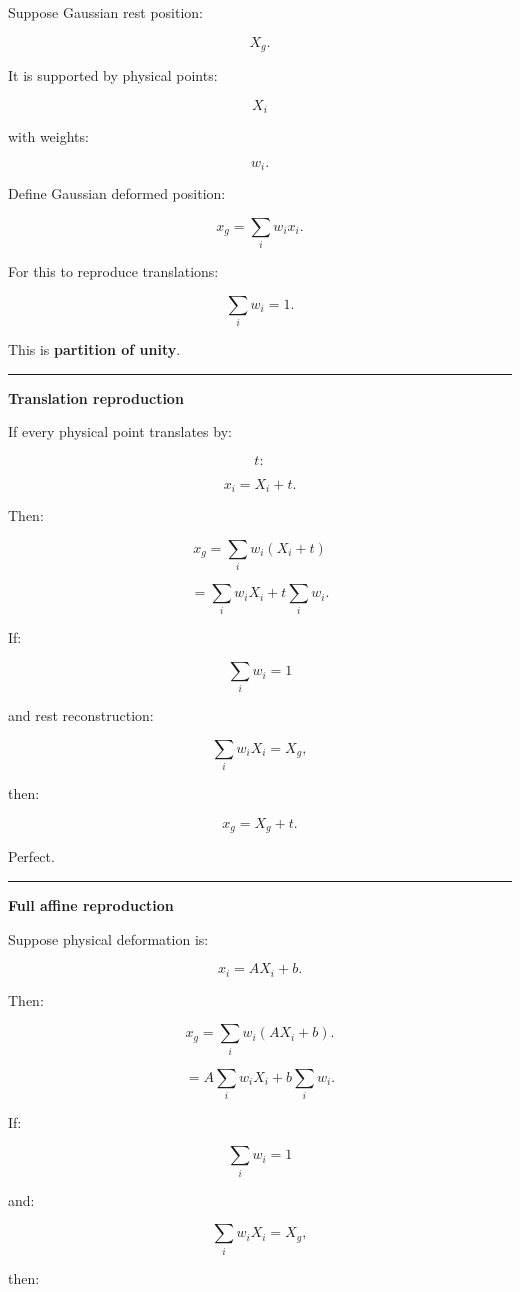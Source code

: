 Suppose Gaussian rest position:

\[
X_g.
\]

It is supported by physical points:

\[
X_i
\]

with weights:

\[
w_i.
\]

Define Gaussian deformed position:

\[
\boxed{
x_g
=
\sum_i
w_i x_i.
}
\]

For this to reproduce translations:

\[
\boxed{
\sum_i w_i=1.
}
\]

This is \textbf{partition of unity}.

\begin{center}\rule{0.5\linewidth}{0.5pt}\end{center}

\textbf{Translation reproduction}

If every physical point translates by:

\[
t:
\]

\[
x_i=X_i+t.
\]

Then:

\[
x_g
=
\sum_i
w_i(X_i+t)
\]

\[
=
\sum_iw_iX_i
+
t\sum_iw_i.
\]

If:

\[
\sum_iw_i=1
\]

and rest reconstruction:

\[
\sum_iw_iX_i=X_g,
\]

then:

\[
\boxed{
x_g=X_g+t.
}
\]

Perfect.

\begin{center}\rule{0.5\linewidth}{0.5pt}\end{center}

\textbf{Full affine reproduction}

Suppose physical deformation is:

\[
x_i=
AX_i+b.
\]

Then:

\[
x_g
=
\sum_i
w_i
(AX_i+b).
\]

\[
=
A\sum_iw_iX_i
+
b\sum_iw_i.
\]

If:

\[
\sum_iw_i=1
\]

and:

\[
\sum_iw_iX_i=X_g,
\]

then:

